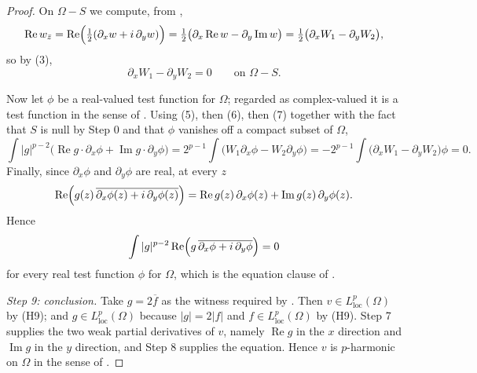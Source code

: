 \begin{proof}
On $\Omega-S$ we compute, from ,
\[
  \operatorname{Re}w_{\bar z}
  =\operatorname{Re}\Bigl(\tfrac12(\partial_xw+i\,\partial_yw)\Bigr)
  =\tfrac12\bigl(\partial_x\operatorname{Re}w-\partial_y\operatorname{Im}w\bigr)
  =\tfrac12\bigl(\partial_xW_1-\partial_yW_2\bigr),
\]
so by (3),
\begin{equation}\tag{7}
  \partial_xW_1-\partial_yW_2=0\qquad\text{on }\Omega-S .
\end{equation}

Now let $\phi$ be a real-valued test function for $\Omega$; regarded as
complex-valued it is a test function in the sense of .  Using
(5), then (6), then (7) together with the fact that $S$ is null by Step 0 and
that $\phi$ vanishes off a compact subset of $\Omega$,
\[
  \int|g|^{p-2}\bigl(\operatorname{Re}g\cdot\partial_x\phi
    +\operatorname{Im}g\cdot\partial_y\phi\bigr)
  =2^{p-1}\int\bigl(W_1\partial_x\phi-W_2\partial_y\phi\bigr)
  =-2^{p-1}\int\bigl(\partial_xW_1-\partial_yW_2\bigr)\phi=0 .
\]
Finally, since $\partial_x\phi$ and $\partial_y\phi$ are real, at every $z$
\[
  \operatorname{Re}\Bigl(g(z)\,
    \overline{\partial_x\phi(z)+i\,\partial_y\phi(z)}\Bigr)
  =\operatorname{Re}g(z)\,\partial_x\phi(z)
    +\operatorname{Im}g(z)\,\partial_y\phi(z).
\]
Hence
\[
  \int|g|^{p-2}\operatorname{Re}
    \Bigl(g\,\overline{\partial_x\phi+i\,\partial_y\phi}\Bigr)=0
\]
for every real test function $\phi$ for $\Omega$, which is the equation clause
of .

\emph{Step 9: conclusion.}  Take $g=2\overline{f}$ as the witness required by
.  Then $v\in L^p_{\mathrm{loc}}(\Omega)$ by (H9); and
$g\in L^p_{\mathrm{loc}}(\Omega)$ because $|g|=2|f|$ and
$f\in L^p_{\mathrm{loc}}(\Omega)$ by (H9).  Step 7 supplies the two weak
partial derivatives of $v$, namely $\operatorname{Re}g$ in the $x$ direction
and $\operatorname{Im}g$ in the $y$ direction, and Step 8 supplies the
equation.  Hence $v$ is $p$-harmonic on $\Omega$ in the sense of
.
\end{proof}
